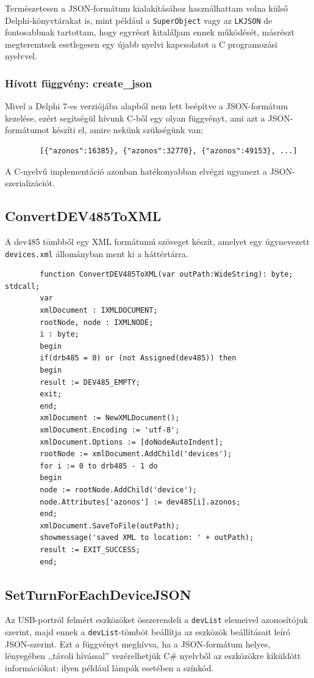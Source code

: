 \documentclass[tocnopagenum]{thesis-ekf}
\begin{document}
	Természetesen a JSON-formátum kialakításához használhattam volna külső Delphi-könyvtárakat is, mint például a \verb*|SuperObject| \cite{json_superobject}
	vagy az \verb*|LKJSON| \cite{json_lkjson} de fontosabbnak tartottam, hogy egyrészt kitaláljam ennek működését, másrészt megteremtsek esetlegesen egy újabb nyelvi kapcsolatot a C programozási nyelvvel.

	\subsubsection{Hívott függvény: create\_json}
	Mivel a Delphi 7-es verziójába alapból nem lett beépítve a JSON-formátum kezelése, ezért segítségül hívunk C-ből egy olyan függvényt, ami azt a JSON-formátumot készíti el, amire nekünk szükségünk van: 
	\begin{verbatim} 
		[{"azonos":16385}, {"azonos":32770}, {"azonos":49153}, ...]
	\end{verbatim}
	A C-nyelvű implementáció azonban hatékonyabban elvégzi ugyanezt a JSON-szerializációt.
	\subsection{ConvertDEV485ToXML} 
	A dev485 tömbből egy XML formátumú szöveget készít, amelyet egy úgynevezett \verb*|devices.xml| állományban ment ki a háttértárra.
	
	\begin{verbatim}
		function ConvertDEV485ToXML(var outPath:WideString): byte; stdcall;
		var
		xmlDocument : IXMLDOCUMENT;
		rootNode, node : IXMLNODE;
		i : byte;
		begin
		if(drb485 = 0) or (not Assigned(dev485)) then
		begin
		result := DEV485_EMPTY;
		exit;
		end;
		xmlDocument := NewXMLDocument();
		xmlDocument.Encoding := 'utf-8';
		xmlDocument.Options := [doNodeAutoIndent];
		rootNode := xmlDocument.AddChild('devices');
		for i := 0 to drb485 - 1 do 
		begin
		node := rootNode.AddChild('device');
		node.Attributes['azonos'] := dev485[i].azonos;
		end;
		xmlDocument.SaveToFile(outPath);
		showmessage('saved XML to location: ' + outPath);
		result := EXIT_SUCCESS;
		end;
	\end{verbatim}

	\subsection{SetTurnForEachDeviceJSON} 
	Az USB-portról felmért eszközöket összerendeli a \verb*|devList| elemeivel azonosítójuk szerint, majd ennek a \verb*|devList|-tömböt beállítja az eszközök beállításait leíró JSON-szerint. Ezt a függvényt meghívva, ha a JSON-formátum helyes, lényegében ,,távoli hívással'' vezérelhetjük C\# nyelvből az eszközökre kiküldött információkat: ilyen például lámpák esetében a színkód.
	
\end{document}
